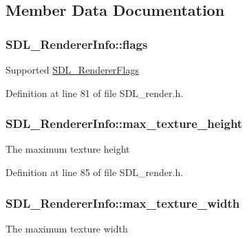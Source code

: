 \subsection{Member Data Documentation}
\hypertarget{struct_s_d_l___renderer_info_a95cf0ffd1704fd0a4dd8ceac6c9f0542}{
\subsubsection[{flags}]{ S\-D\-L\-\_\-\-Renderer\-Info\-::flags}}\label{struct_s_d_l___renderer_info_a95cf0ffd1704fd0a4dd8ceac6c9f0542}
Supported \hyperlink{_s_d_l__render_8h_a3a6e51bbee5fd3f8ee0c9f7504ae4130}{S\-D\-L\-\_\-\-Renderer\-Flags} 

Definition at line 81 of file S\-D\-L\-\_\-render.\-h.

\hypertarget{struct_s_d_l___renderer_info_a87c6a13e8d535c2148f8913c05e13102}{
\subsubsection[{max\-\_\-texture\-\_\-height}]{ S\-D\-L\-\_\-\-Renderer\-Info\-::max\-\_\-texture\-\_\-height}}\label{struct_s_d_l___renderer_info_a87c6a13e8d535c2148f8913c05e13102}
The maximum texture height 

Definition at line 85 of file S\-D\-L\-\_\-render.\-h.

\hypertarget{struct_s_d_l___renderer_info_a6e6757e3d5c1f0922adaba39380edfa6}{
\subsubsection[{max\-\_\-texture\-\_\-width}]{ S\-D\-L\-\_\-\-Renderer\-Info\-::max\-\_\-texture\-\_\-width}}\label{struct_s_d_l___renderer_info_a6e6757e3d5c1f0922adaba39380edfa6}
The maximum texture width 

